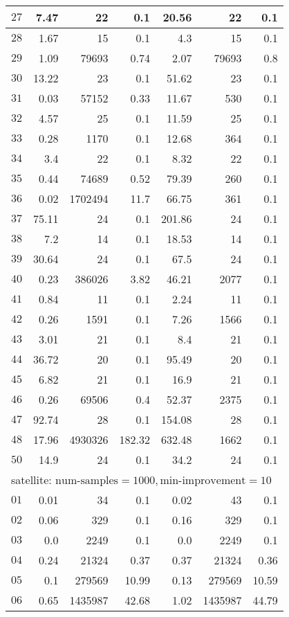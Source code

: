\begin{longtable}{|c||r|r|r||r|r|r|}
$27$ & 7.47 & 22 & 0.1 &20.56 & 22 & 0.1 \\\hline
$28$ & 1.67 & 15 & 0.1 &4.3 & 15 & 0.1 \\\hline
$29$ & 1.09 & 79693 & 0.74 &2.07 & 79693 & 0.8 \\\hline
$30$ & 13.22 & 23 & 0.1 &51.62 & 23 & 0.1 \\\hline
$31$ & 0.03 & 57152 & 0.33 &11.67 & 530 & 0.1 \\\hline
$32$ & 4.57 & 25 & 0.1 &11.59 & 25 & 0.1 \\\hline
$33$ & 0.28 & 1170 & 0.1 &12.68 & 364 & 0.1 \\\hline
$34$ & 3.4 & 22 & 0.1 &8.32 & 22 & 0.1 \\\hline
$35$ & 0.44 & 74689 & 0.52 &79.39 & 260 & 0.1 \\\hline
$36$ & 0.02 & 1702494 & 11.7 &66.75 & 361 & 0.1 \\\hline
$37$ & 75.11 & 24 & 0.1 &201.86 & 24 & 0.1 \\\hline
$38$ & 7.2 & 14 & 0.1 &18.53 & 14 & 0.1 \\\hline
$39$ & 30.64 & 24 & 0.1 &67.5 & 24 & 0.1 \\\hline
$40$ & 0.23 & 386026 & 3.82 &46.21 & 2077 & 0.1 \\\hline
$41$ & 0.84 & 11 & 0.1 &2.24 & 11 & 0.1 \\\hline
$42$ & 0.26 & 1591 & 0.1 &7.26 & 1566 & 0.1 \\\hline
$43$ & 3.01 & 21 & 0.1 &8.4 & 21 & 0.1 \\\hline
$44$ & 36.72 & 20 & 0.1 &95.49 & 20 & 0.1 \\\hline
$45$ & 6.82 & 21 & 0.1 &16.9 & 21 & 0.1 \\\hline
$46$ & 0.26 & 69506 & 0.4 &52.37 & 2375 & 0.1 \\\hline
$47$ & 92.74 & 28 & 0.1 &154.08 & 28 & 0.1 \\\hline
$48$ & 17.96 & 4930326 & 182.32 &632.48 & 1662 & 0.1 \\\hline
$50$ & 14.9 & 24 & 0.1 &34.2 & 24 & 0.1 \\\hline

\multicolumn{7}{|l|}{satellite: $\text{num-samples}=1000,\text{min-improvement}=10$}\\\hline
$01$ & 0.01 & 34 & 0.1 &0.02 & 43 & 0.1 \\\hline
$02$ & 0.06 & 329 & 0.1 &0.16 & 329 & 0.1 \\\hline
$03$ & 0.0 & 2249 & 0.1 &0.0 & 2249 & 0.1 \\\hline
$04$ & 0.24 & 21324 & 0.37 &0.37 & 21324 & 0.36 \\\hline
$05$ & 0.1 & 279569 & 10.99 &0.13 & 279569 & 10.59 \\\hline
$06$ & 0.65 & 1435987 & 42.68 &1.02 & 1435987 & 44.79 \\\hline


\end{longtable}
